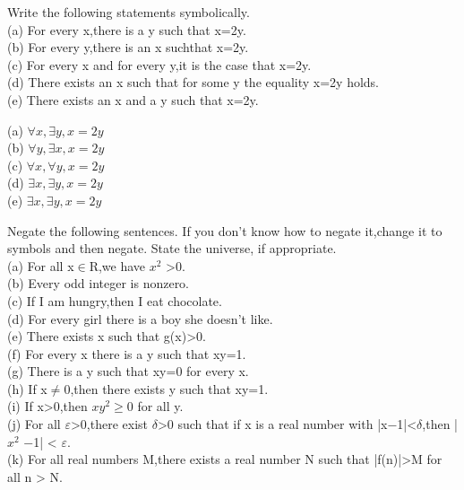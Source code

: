 \documentclass[11pt, a4paper, UTF8]{ctexart}
\begin{document}
\begin{problem}[UD:4.1]
Write the following statements symbolically.\\
(a) For every x,there is a y such that x=2y.\\
(b) For every y,there is an x suchthat x=2y.\\
(c) For every x and for every y,it is the case that x=2y.\\
(d) There exists an x such that for some y the equality x=2y holds.\\
(e) There exists an x and a y such that x=2y.\\
\end{problem}

\begin{solution}
(a) $\forall x,\exists y, x=2y$\\
(b) $\forall y,\exists x, x=2y$\\
(c) $\forall x,\forall y, x=2y$\\
(d) $\exists x,\exists y, x=2y$\\
(e) $\exists x,\exists y, x=2y$\\
\end{solution}


\begin{problem}[UD:4.5]
Negate the following sentences. If you don’t know how to negate it,change it to symbols and then negate. State the universe, if appropriate.\\
(a) For all x$\in$R,we have $x^2$ >0.\\
(b) Every odd integer is nonzero.\\
(c) If I am hungry,then I eat chocolate.\\
(d) For every girl there is a boy she doesn’t like.\\
(e) There exists x such that g(x)>0.\\
(f) For every x there is a y such that xy=1.\\
(g) There is a y such that xy=0 for every x.\\
(h) If x$\not=$0,then there exists y such that xy=1.\\
(i) If x>0,then $xy^2$$\geq$0 for all y.\\
(j) For all $\varepsilon$>0,there exist $\delta$>0 such that if x is a real number with |x−1|<$\delta$,then |$x^2$ −1| < $\varepsilon$.\\
(k) For all real numbers M,there exists a real number N such that |f(n)|>M for all n > N.
\end{problem}
\end{document}

